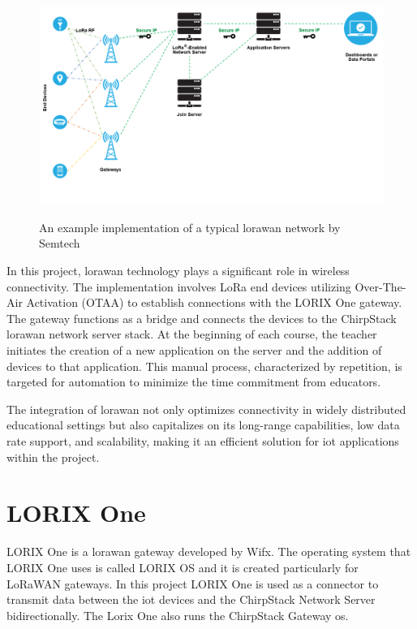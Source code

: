 \begin{figure}[ht]
  \centering
  {\includegraphics[width=\textwidth]{illustration/lorawan_network_implementation.png}}
  \caption{An example implementation of a typical \gls{lorawan} network by Semtech\cite{semtech:loRaAndLoRaWAN}}
  \label{fig:lorawan_network}
\end{figure}

In this project, \gls{lorawan} technology plays a significant role in wireless connectivity.
The implementation involves LoRa end devices utilizing Over-The-Air Activation (OTAA) to establish connections with the LORIX One gateway.
The gateway functions as a bridge and connects the devices to the ChirpStack \gls{lorawan} network server stack.
At the beginning of each course, the teacher initiates the creation of a new application on the server and the addition of devices to that application.
This manual process, characterized by repetition, is targeted for automation to minimize the time commitment from educators.

The integration of \gls{lorawan} not only optimizes connectivity in widely distributed educational settings but also capitalizes on its long-range capabilities, low data rate support, and scalability, making it an efficient solution for \gls{iot} applications within the project.
\cite{lora-developer-portal:about}

\section{LORIX One}
LORIX One is a \gls{lorawan} gateway developed by Wifx\cite{wifx:lorixone}.
The operating system that LORIX One uses is called LORIX OS and it is created particularly for LoRaWAN gateways.
In this project LORIX One is used as a connector to transmit data between the \gls{iot} devices and the ChirpStack Network Server bidirectionally.
The Lorix One also runs the ChirpStack Gateway \gls{os}.

